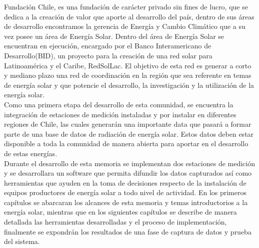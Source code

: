 Fundación Chile, es una fundación de carácter privado sin fines de lucro, que se dedica a la creación de valor que aporte al desarrollo del país, dentro de sus áreas de desarrollo encontramos la gerencia de Energía y Cambio Climático que a su vez posee un área de Energía Solar. Dentro del área de Energía Solar se encuentran en ejecución, encargado por el Banco Interamericano de Desarrollo(BID), un proyecto para la creación de una red solar para Latinoamérica y el Caribe, RedSolLac\cite{redSolLac:1}. El objetivo de esta red es generar a corto y mediano plazo una red de coordinación en la región que sea referente en temas de energía solar y que potencie el desarrollo, la investigación y la utilización de la energía solar.\\
 
Como una primera etapa del desarrollo de esta comunidad, se encuentra la integración de estaciones de medición instaladas y por instalar en diferentes regiones de Chile, las cuales generarán una importante data que pasará a formar parte de una base de datos de radiación de energía solar. Estos datos deben estar disponible a toda la comunidad de manera abierta para aportar en el desarrollo de estas energías.\\

	Durante el desarrollo de esta memoria se implementan dos estaciones de medición y se desarrollara un software que permita difundir los datos capturados así como herramientas que ayuden en la toma de decisiones respecto de la instalación de equipos productores de energía solar a todo nivel de actividad. En los primeros capítulos se abarcaran los alcances de esta memoria y temas introductorios a la energía solar, mientras que en los siguientes capítulos se describe de manera detallada las herramientas desarrolladas y el proceso de implementación, finalmente se expondrán los resultados de una fase de captura de datos y prueba del sistema.
